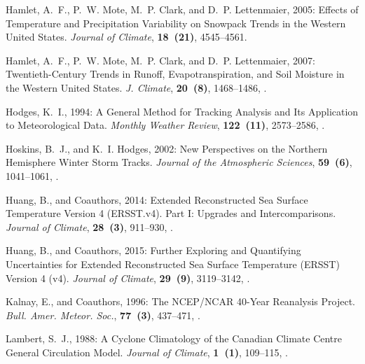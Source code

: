 \documentclass[final, double]{ua-thesis}
\begin{document}
\begin{thebibliography}{}
Hamlet, A.~F., P.~W. Mote, M.~P. Clark, and D.~P. Lettenmaier, 2005: Effects of
  {Temperature} and {Precipitation} {Variability} on {Snowpack} {Trends} in the
  {Western} {United} {States}. \textit{Journal of Climate}, \textbf{18~(21)},
  4545--4561.

Hamlet, A.~F., P.~W. Mote, M.~P. Clark, and D.~P. Lettenmaier, 2007:
  Twentieth-{Century} {Trends} in {Runoff}, {Evapotranspiration}, and {Soil}
  {Moisture} in the {Western} {United} {States}. \textit{J. Climate},
  \textbf{20~(8)}, 1468--1486, .

Hodges, K.~I., 1994: A {General} {Method} for {Tracking} {Analysis} and {Its}
  {Application} to {Meteorological} {Data}. \textit{Monthly Weather Review},
  \textbf{122~(11)}, 2573--2586,
  .

Hoskins, B.~J., and K.~I. Hodges, 2002: New {Perspectives} on the {Northern}
  {Hemisphere} {Winter} {Storm} {Tracks}. \textit{Journal of the Atmospheric
  Sciences}, \textbf{59~(6)}, 1041--1061,
  .

Huang, B., and Coauthors, 2014: Extended {Reconstructed} {Sea} {Surface}
  {Temperature} {Version} 4 ({ERSST}.v4). {Part} {I}: {Upgrades} and
  {Intercomparisons}. \textit{Journal of Climate}, \textbf{28~(3)}, 911--930,
  .

Huang, B., and Coauthors, 2015: Further {Exploring} and {Quantifying}
  {Uncertainties} for {Extended} {Reconstructed} {Sea} {Surface} {Temperature}
  ({ERSST}) {Version} 4 (v4). \textit{Journal of Climate}, \textbf{29~(9)},
  3119--3142, .
  
Kalnay, E., and Coauthors, 1996: The {NCEP}/{NCAR} 40-{Year} {Reanalysis}
  {Project}. \textit{Bull. Amer. Meteor. Soc.}, \textbf{77~(3)}, 437--471,
  .

Lambert, S.~J., 1988: A {Cyclone} {Climatology} of the {Canadian} {Climate}
  {Centre} {General} {Circulation} {Model}. \textit{Journal of Climate},
  \textbf{1~(1)}, 109--115,
  .


\end{thebibliography}
\end{document}
